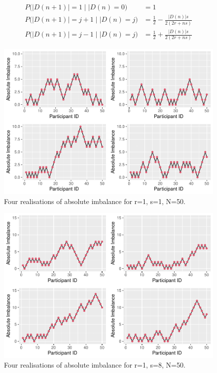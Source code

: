 \documentclass[
  openany]{book}
\theoremstyle{definition}
\theoremstyle{definition}
\theoremstyle{definition}
\theoremstyle{definition}
\theoremstyle{remark}
\begin{document}
\[
  \begin{aligned}
P\big(\lvert D\left(n+1\right) \rvert = 1 \mid \lvert D\left(n\right)=0\big)& = 1\\
P\big(\lvert D\left(n+1\right) \rvert = j+ 1 \mid \lvert D\left(n\right)=j\big)& = \frac{1}{2}  - \frac{\lvert D\left(n\right)\rvert s}{2\left(2r + ns\right)}\\
P\big(\lvert D\left(n+1\right) \rvert = j-1 \mid \lvert D\left(n\right)=j\big)& = \frac{1}{2}  + \frac{\lvert D\left(n\right)\rvert s}{2\left(2r + ns\right)}
\end{aligned}
\]

\begin{figure}
\centering
\includegraphics{CT4H_notes_files/figure-latex/urn11-1.pdf}
\caption{\label{fig:urn11}Four realisations of absolute imbalance for r=1, s=1, N=50.}
\end{figure}

\begin{figure}
\centering
\includegraphics{CT4H_notes_files/figure-latex/urn18-1.pdf}
\caption{\label{fig:urn18}Four realisations of absolute imbalance for r=1, s=8, N=50.}
\end{figure}
\end{document}
